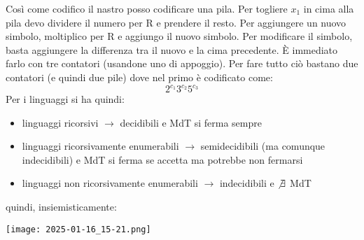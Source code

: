 	Così come codifico il nastro posso codificare una pila. Per togliere $x_1$ in cima alla pila devo dividere
	il numero per R e prendere il resto. Per aggiungere un nuovo simbolo, moltiplico per R e aggiungo il
	nuovo simbolo. Per modificare il simbolo, basta aggiungere la differenza tra il nuovo e la cima precedente. È immediato farlo con tre contatori (usandone uno di appoggio).
	Per fare tutto ciò bastano due contatori (e quindi due pile) dove nel primo è codificato come:
	$$2^{c_1}3^{c_2}5^{c_3}$$
	Per i linguaggi si ha quindi:
	\begin{itemize}
		\item linguaggi ricorsivi $\to$ decidibili e MdT si ferma sempre
		\item linguaggi ricorsivamente enumerabili $\to$ semidecidibili (ma comunque indecidibili) e MdT si ferma se accetta ma potrebbe non fermarsi
		\item linguaggi non ricorsivamente enumerabili $\to$ indecidibili e $\not\exists$ MdT
	\end{itemize}
	quindi, insiemisticamente:
	\begin{center}
			\texttt{[image: 2025-01-16\_15-21.png]}


	\end{center}

